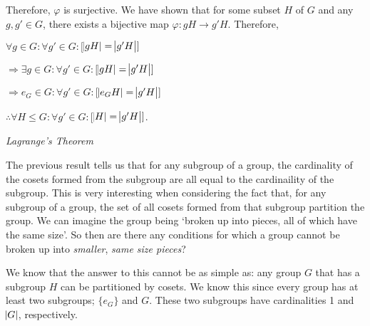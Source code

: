 \documentclass[12pt, a4paper]{article}
\begin{document}
\begin{flushleft}

    Therefore, $\varphi$ is surjective. We have shown that for some subset $H$ of $G$ and any $g,g'\in G$, there exists a bijective map $\varphi\colon gH\rightarrow g'H$. Therefore,\par

\end{flushleft}

\hspace{2mm}$\forall g\in G\colon\forall g'\in G\colon[$\hspace{1mm}$\abs{gH}=\abs{g'H}]$\par
\vspace{2mm}
\hspace{10mm} $\Rightarrow\exists g\in G\colon\forall g'\in G\colon[$\hspace{1mm}$\abs{gH}=\abs{g'H}]$\par
\vspace{2mm}
\hspace{10mm} $\Rightarrow e_G\in G\colon\forall g'\in G\colon[$\hspace{1mm}$\abs{e_GH}=\abs{g'H}]$\par
\vspace{2mm}
\hspace{2mm} $\therefore \forall H\leqslant G\colon\forall g'\in G\colon[$\hspace{1mm}$\abs{H}=\abs{g'H}]$.\par

\vspace{4mm}

\begin{flushleft}

    \large{\textit{Lagrange's Theorem}}

\end{flushleft}

    The previous result tells us that for any subgroup of a group, the cardinality of the cosets formed from the subgroup are all equal to the cardinaility of the subgroup. This is very interesting when considering the fact that, for any subgroup of a group, the set of all cosets formed from that subgroup partition the group. We can imagine the group being `broken up into pieces, all of which have the same size'. So then are there any conditions for which a group cannot be broken up into \textit{smaller}, \textit{same size pieces}?\par
    
    We know that the answer to this cannot be as simple as: any group $G$ that has a subgroup $H$ can be partitioned by cosets. We know this since every group has at least two subgroups; $\{e_G\}$ and $G$. These two subgroups have cardinalities 1 and $\abs{G}$, respectively.\par
    
\end{document}
